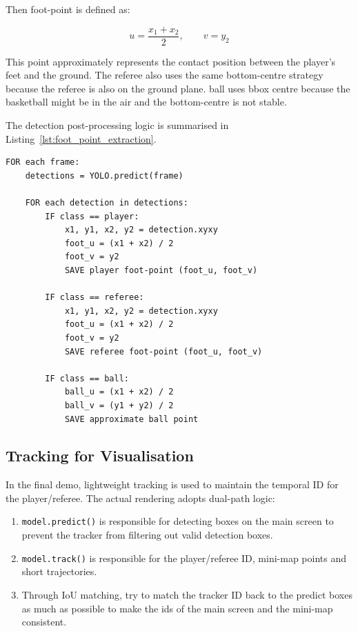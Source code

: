 \documentclass[12pt,a4paper]{article}
\begin{document}
Then foot-point is defined as:

\[
u = \frac{x_1 + x_2}{2}, \qquad v = y_2
\]

This point approximately represents the contact position between the player's feet and the ground. The referee also uses the same bottom-centre strategy because the referee is also on the ground plane. ball uses bbox centre because the basketball might be in the air and the bottom-centre is not stable.

The detection post-processing logic is summarised in Listing~\ref{lst:foot_point_extraction}.

\begin{lstlisting}[style=pseudocode,caption={Detection and foot-point extraction.},label={lst:foot_point_extraction}]
FOR each frame:
    detections = YOLO.predict(frame)

    FOR each detection in detections:
        IF class == player:
            x1, y1, x2, y2 = detection.xyxy
            foot_u = (x1 + x2) / 2
            foot_v = y2
            SAVE player foot-point (foot_u, foot_v)

        IF class == referee:
            x1, y1, x2, y2 = detection.xyxy
            foot_u = (x1 + x2) / 2
            foot_v = y2
            SAVE referee foot-point (foot_u, foot_v)

        IF class == ball:
            ball_u = (x1 + x2) / 2
            ball_v = (y1 + y2) / 2
            SAVE approximate ball point
\end{lstlisting}

\subsection{Tracking for Visualisation}

In the final demo, lightweight tracking is used to maintain the temporal ID for the player/referee. The actual rendering adopts dual-path logic:

\begin{enumerate}[leftmargin=1.8em]
    \item \texttt{model.predict()} is responsible for detecting boxes on the main screen to prevent the tracker from filtering out valid detection boxes.
    \item \texttt{model.track()} is responsible for the player/referee ID, mini-map points and short trajectories.
    \item Through IoU matching, try to match the tracker ID back to the predict boxes as much as possible to make the ids of the main screen and the mini-map consistent.
\end{enumerate}
\end{document}
